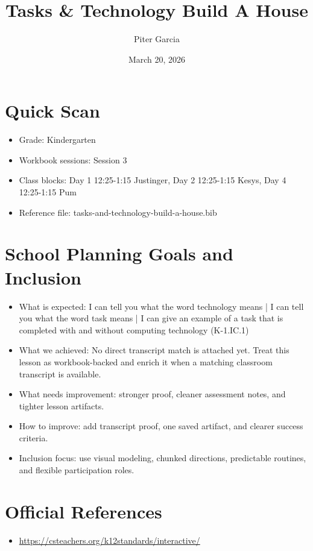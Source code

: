 \documentclass[11pt]{article}
\title{Tasks & Technology Build A House}
\author{Piter Garcia}
\date{March 20, 2026}
\begin{document}
\maketitle
\section*{Quick Scan}
\begin{itemize}[leftmargin=*]
\item Grade: Kindergarten
\item Workbook sessions: Session 3
\item Class blocks: Day 1 12:25-1:15 Justinger, Day 2 12:25-1:15 Kesys, Day 4 12:25-1:15 Pum
\item Reference file: tasks-and-technology-build-a-house.bib
\end{itemize}
\section*{School Planning Goals and Inclusion}
\begin{itemize}[leftmargin=*]
\item What is expected: I can tell you what the word technology means | I can tell you what the word task means | I can give an example of a task that is completed with and without computing technology (K-1.IC.1)
\item What we achieved: No direct transcript match is attached yet. Treat this lesson as workbook-backed and enrich it when a matching classroom transcript is available.
\item What needs improvement: stronger proof, cleaner assessment notes, and tighter lesson artifacts.
\item How to improve: add transcript proof, one saved artifact, and clearer success criteria.
\item Inclusion focus: use visual modeling, chunked directions, predictable routines, and flexible participation roles.
\end{itemize}
\section*{Official References}
\begin{itemize}[leftmargin=*]
\item \url{https://csteachers.org/k12standards/interactive/}

\end{itemize}
\end{document}
